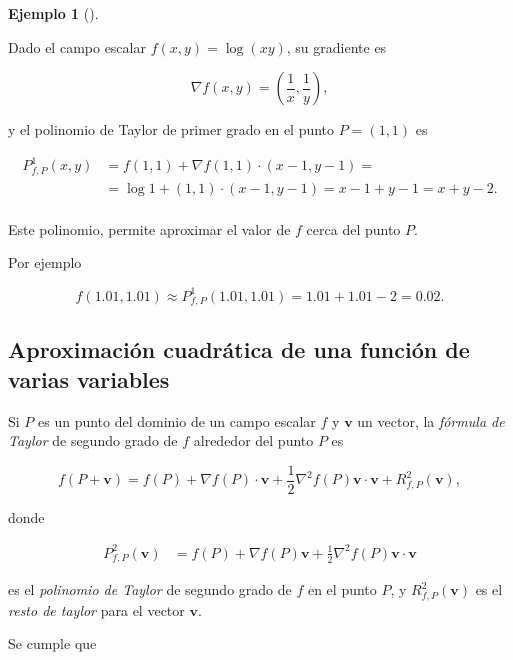 \documentclass[
  a4paper,
]{scrreport}
\theoremstyle{plain}
\theoremstyle{plain}
\theoremstyle{definition}
\theoremstyle{definition}
\newtheorem{example}{Ejemplo}[chapter]
\theoremstyle{plain}
\theoremstyle{definition}
\theoremstyle{remark}
\begin{document}
\begin{example}[]\protect\hypertarget{exm-aproximacion-lineal-funcion-varias-variables}{}\label{exm-aproximacion-lineal-funcion-varias-variables}

Dado el campo escalar \(f(x,y)=\log(xy)\), su gradiente es

\[\nabla f(x,y) = \left(\frac{1}{x},\frac{1}{y}\right),\]

y el polinomio de Taylor de primer grado en el punto \(P=(1,1)\) es

\[
\begin{aligned}
P^1_{f,P}(x,y) &= f(1,1) +\nabla f(1,1)\cdot (x-1,y-1) = \\
&= \log 1+(1,1)\cdot(x-1,y-1) = x-1+y-1 = x+y-2.\\
\end{aligned}
\]

Este polinomio, permite aproximar el valor de \(f\) cerca del punto
\(P\).

Por ejemplo

\[f(1.01,1.01) \approx P^1_{f,P}(1.01,1.01) = 1.01+1.01-2 = 0.02.\]

\end{example}

\hypertarget{aproximaciuxf3n-cuadruxe1tica-de-una-funciuxf3n-de-varias-variables}{%
\subsection{Aproximación cuadrática de una función de varias
variables}\label{aproximaciuxf3n-cuadruxe1tica-de-una-funciuxf3n-de-varias-variables}}

Si \(P\) es un punto del dominio de un campo escalar \(f\) y
\(\mathbf{v}\) un vector, la \emph{fórmula de Taylor} de segundo grado
de \(f\) alrededor del punto \(P\) es

\[f(P+\mathbf{v}) = f(P) + \nabla f(P)\cdot \mathbf{v} + \frac{1}{2}\nabla^2f(P)\mathbf{v}\cdot\mathbf{v} + R^2_{f,P}(\mathbf{v}),\]

donde

\[
\begin{aligned}
P^2_{f,P}(\mathbf{v})&=f(P)+\nabla f(P)\mathbf{v}+\frac{1}{2}\nabla^2f(P)\mathbf{v}\cdot\mathbf{v}
\end{aligned}
\]

es el \emph{polinomio de Taylor} de segundo grado de \(f\) en el punto
\(P\), y \(R^2_{f,P}(\mathbf{v})\) es el \emph{resto de taylor} para el
vector \(\mathbf{v}\).

Se cumple que
\end{document}
